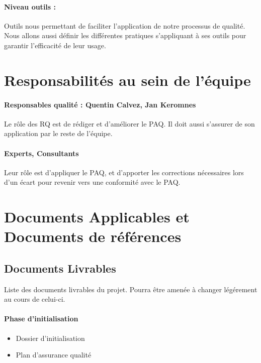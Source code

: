 \paragraph{Niveau outils :} Outils nous permettant de faciliter l'application de notre processus de qualité. Nous allons aussi définir les différentes pratiques s'appliquant à ses outils pour garantir l'efficacité de leur usage.

\section{Responsabilités au sein de l'équipe}

\paragraph{Responsables qualité : Quentin Calvez, Jan Keromnes} Le rôle des RQ est de rédiger et d'améliorer le PAQ. Il doit aussi s'assurer de son application par le reste de l'équipe.

\paragraph{Experts, Consultants} Leur rôle est d'appliquer le PAQ, et d'apporter les corrections nécessaires lors d'un écart pour revenir vers une conformité avec le PAQ.

\section{Documents Applicables et Documents de références}

\subsection{Documents Livrables}

Liste des documents livrables du projet. Pourra être amenée à changer légérement au cours de celui-ci.

\paragraph*{Phase d'initialisation}

\begin{itemize}
\item Dossier d'initialisation
\item Plan d'assurance qualité
\end{itemize}


